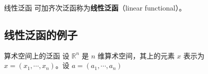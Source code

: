 \begin{definition}{线性泛函}
可加齐次泛函称为\textbf{线性泛函}（linear functional）。
\end{definition}


\subsection{线性泛函的例子}

\begin{example}{算术空间上的泛函}
设 $\mathbb R^n$ 是 $n$ 维算术空间，其上的元素 $x$ 表示为 $x=(x_1,\cdots,x_n)$。设 $a=(a_1,\cdots,a_n)$
\end{example}








